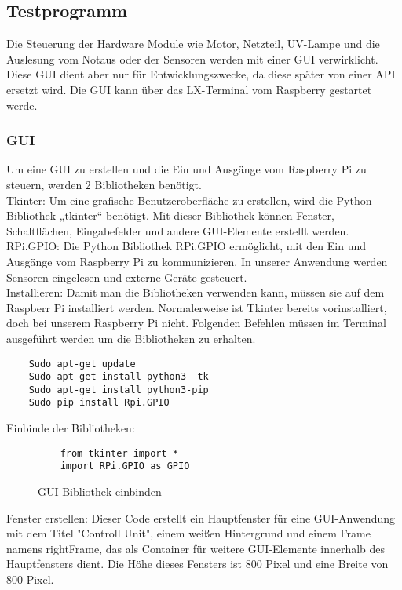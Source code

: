 
\subsection{Testprogramm}\label{sec:Testprogramm} 
\SecAuth{\nameJS}
Die Steuerung der Hardware Module wie Motor, Netzteil, UV-Lampe und die Auslesung vom Notaus oder der Sensoren werden mit einer GUI verwirklicht. Diese GUI dient aber nur für Entwicklungszwecke, da diese später von einer API ersetzt wird. Die GUI kann über das LX-Terminal vom Raspberry gestartet werde.
\subsubsection{GUI}\label{sec:GUI}
Um eine GUI zu erstellen und die Ein und Ausgänge vom Raspberry Pi zu steuern, werden 2 Bibliotheken benötigt.\\
\vspace{3mm}
Tkinter: Um eine grafische Benutzeroberfläche zu erstellen, wird die Python-Bibliothek „tkinter“ benötigt. Mit dieser Bibliothek können Fenster, Schaltflächen, Eingabefelder und andere GUI-Elemente erstellt werden.\\
\vspace{3mm}
RPi.GPIO: Die Python Bibliothek RPi.GPIO ermöglicht, mit den Ein und Ausgänge vom Raspberry Pi zu kommunizieren. In unserer Anwendung werden Sensoren eingelesen und externe Geräte gesteuert.\\
\vspace{3mm}
Installieren: Damit man die Bibliotheken verwenden kann, müssen sie auf dem Raspberr Pi installiert werden. Normalerweise ist Tkinter bereits vorinstalliert, doch bei unserem Raspberry Pi nicht. Folgenden Befehlen müssen im Terminal ausgeführt werden um die Bibliotheken zu erhalten.\\
\begin{verbatim}
    Sudo apt-get update
    Sudo apt-get install python3 -tk
    Sudo apt-get install python3-pip
    Sudo pip install Rpi.GPIO
\end{verbatim}
\pagebreak
Einbinde der Bibliotheken:
\begin{figure}[H]
    \centering
    \begin{verbatim}
    from tkinter import *
    import RPi.GPIO as GPIO
    \end{verbatim}
    \caption{GUI-Bibliothek einbinden}
\end{figure}
Fenster erstellen: Dieser Code erstellt ein Hauptfenster für eine GUI-Anwendung mit dem Titel "Controll Unit", einem weißen Hintergrund und einem Frame namens rightFrame, das als Container für weitere GUI-Elemente innerhalb des Hauptfensters dient. Die Höhe dieses Fensters ist 800 Pixel und eine Breite von 800 Pixel.\\
